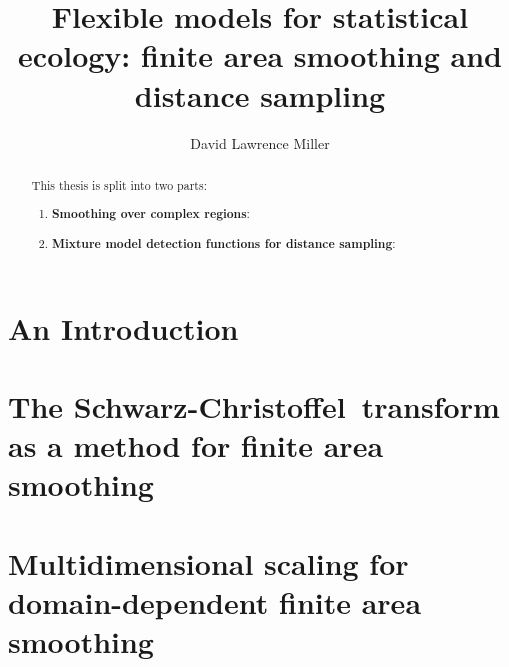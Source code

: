 \documentclass[mitthesis,12pt]{report}
\title{Flexible models for statistical ecology: finite area smoothing and distance sampling}
\author{David Lawrence Miller}
\newcommand{\sch}{Schwarz-Christoffel}
\begin{document}
\maketitle
\begin{abstract} 
This thesis is split into two parts:
\begin{enumerate}
	\item \textbf{Smoothing over complex regions}:
	\item \textbf{Mixture model detection functions for distance sampling}:
\end{enumerate}
\end{abstract}

\tableofcontents

\listoffigures

\listoftables

\chapter{An Introduction}
%



\chapter{The \sch\ transform as a method for finite area smoothing}
%



\chapter{Multidimensional scaling for domain-dependent finite area smoothing}


\end{document}
